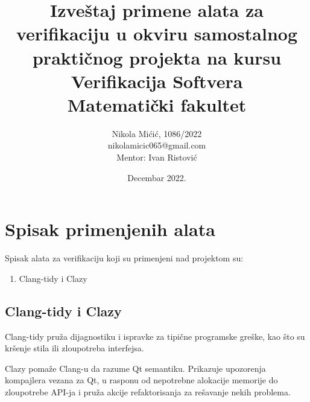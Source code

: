 \documentclass[a4paper]{article}
\begin{document}
\title{Izveštaj primene alata za verifikaciju u okviru samostalnog praktičnog projekta na kursu Verifikacija Softvera
\\\small{ Matematički fakultet}}
\author{Nikola Mićić, 1086/2022 \\
\normalsize {nikolamicic065@gmail.com} \\ 
\normalsize {Mentor: Ivan Ristović}
}

\date{Decembar  2022.}

\maketitle
{}


\begin{spacing}{0.7}
    \tableofcontents
\end{spacing}

\newpage
\section{Spisak primenjenih alata}
Spisak alata za verifikaciju koji su primenjeni nad projektom su:

\begin{enumerate}
    \item Clang-tidy i Clazy
\end{enumerate}

\subsection{Clang-tidy i Clazy}
Clang-tidy pruža dijagnostiku i ispravke za tipične programske greške, kao što su kršenje stila ili zloupotreba interfejsa.

Clazy pomaže Clang-u da razume Qt semantiku. Prikazuje upozorenja kompajlera vezana za Qt, u rasponu od nepotrebne alokacije memorije do zloupotrebe API-ja i pruža akcije refaktorisanja za rešavanje nekih problema.
\end{document}
